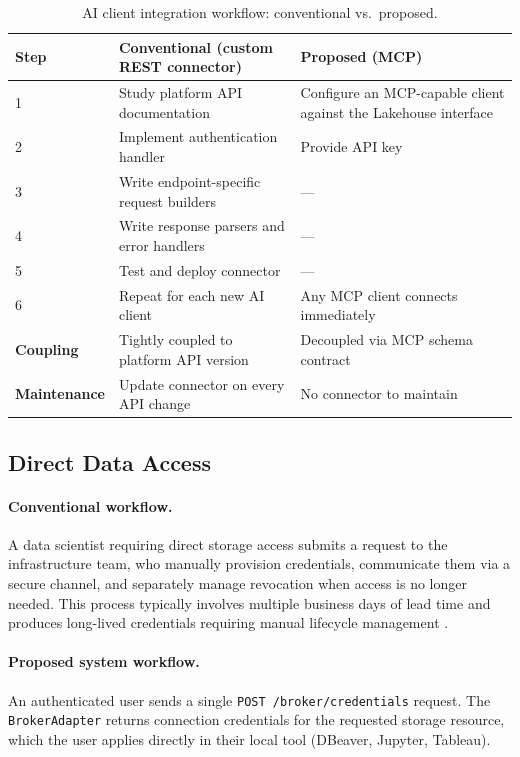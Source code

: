\documentclass[12pt, a4paper]{report}
\begin{document}
\begin{table}[H]
  \centering
  \caption{AI client integration workflow: conventional vs.\ proposed.}
  \label{tab:mcp_workflow}
  \begin{tabularx}{\textwidth}{lXX}
    \toprule
    \textbf{Step} &
    \textbf{Conventional (custom REST connector)} &
    \textbf{Proposed (MCP)} \\
    \midrule
    1 & Study platform API documentation & Configure an MCP-capable client against the Lakehouse interface \\
    2 & Implement authentication handler & Provide API key \\
    3 & Write endpoint-specific request builders & --- \\
    4 & Write response parsers and error handlers & --- \\
    5 & Test and deploy connector & --- \\
    6 & Repeat for each new AI client & Any MCP client connects immediately \\
    \midrule
    \textbf{Coupling} &
    Tightly coupled to platform API version &
    Decoupled via MCP schema contract \\
    \textbf{Maintenance} &
    Update connector on every API change &
    No connector to maintain \\
    \bottomrule
  \end{tabularx}
\end{table}

\subsection{Direct Data Access}
\label{ssec:broker_usability}

\paragraph{Conventional workflow.}
A data scientist requiring direct storage access submits a request to the
infrastructure team, who manually provision credentials, communicate them via a secure
channel, and separately manage revocation when access is no longer needed.
This process typically involves multiple business days of lead time and produces
long-lived credentials requiring manual lifecycle management \citep{mckinsey2024}.

\paragraph{Proposed system workflow.}
An authenticated user sends a single \texttt{POST /broker/credentials} request.
The \texttt{BrokerAdapter} returns connection credentials for the requested storage
resource, which the user applies directly in their local tool (DBeaver, Jupyter,
Tableau).
\end{document}
